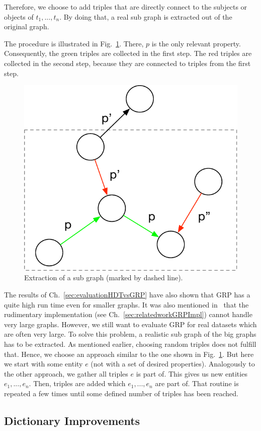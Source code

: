 Therefore, we choose to add triples that are directly connect to the subjects or objects of $t_1,...,t_n$. By doing that, a real sub graph is extracted out of the original graph.

The procedure is illustrated in Fig.~\ref{fig:subgraph}. There, $p$ is the only relevant property. Consequently, the green triples are collected in the first step. The red triples are collected in the second step, because they are connected to triples from the first step.

\begin{figure}
	\centering
	\includegraphics[width=0.4\linewidth]{figures/4_implementation/subgraph}
	\caption{Extraction of a sub graph (marked by dashed line).}
	\label{fig:subgraph}
\end{figure}

The results of Ch.~\ref{sec:evaluationHDTvsGRP} have also shown that GRP has a quite high run time even for smaller graphs. It was also mentioned in~\cite{maneth} that the rudimentary implementation (see Ch.~\ref{sec:relatedworkGRPImpl}) cannot handle very large graphs. However, we still want to evaluate GRP for real datasets which are often very large. To solve this problem, a realistic sub graph of the big graphs has to be extracted. As mentioned earlier, choosing random triples does not fulfill that. Hence, we choose an approach similar to the one shown in Fig.~\ref{fig:subgraph}. But here we start with some entity $e$ (not with a set of desired properties). Analogously to the other approach, we gather all triples $e$ is part of. This gives us new entities $e_1,...,e_n$. Then, triples are added which $e_1,...,e_n$ are part of. That routine is repeated a few times until some defined number of triples has been reached. 



\subsection{Dictionary Improvements}\label{sec:implementationDictImprovements}

